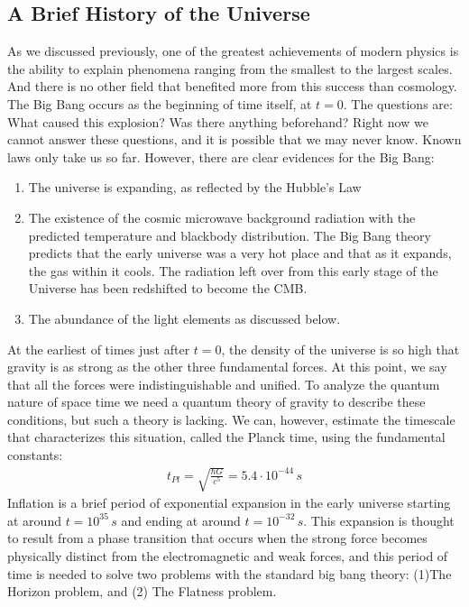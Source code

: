 \documentclass[11pt]{article}
\theoremstyle{break}
\theoremstyle{break}
\begin{document}
\subsection{A Brief History of the Universe}
As we discussed previously, one of the greatest achievements of modern physics is the ability to explain phenomena ranging from the smallest to the largest scales. 
And there is no other field that benefited more from this success than cosmology. \\

The Big Bang occurs as the beginning of time itself, at $t=0$. The questions are: What caused this explosion? Was there anything beforehand? Right now we cannot answer these questions, and it is possible that we may never know. Known laws only take us so far. However, there are clear evidences for the Big Bang:
\begin{enumerate}
\item The universe is expanding, as reflected by the Hubble's Law
\item  The existence of the cosmic microwave background radiation with the predicted temperature and blackbody distribution. The Big Bang theory predicts that the early universe was a very hot place and that as it expands,
the gas within it cools. The radiation left over from this early stage of the Universe has been redshifted to become the CMB.
\item  The abundance of the light elements as discussed below. 
\end{enumerate}

At the earliest of times just after $t=0$, the density of the universe is so high that gravity is as strong as the other three fundamental forces.  At this point, we say that all the forces were indistinguishable and unified. To analyze the quantum nature of space time we need a quantum theory of gravity to describe these conditions, but such a theory is lacking. We can, however, estimate the timescale that characterizes this situation, called the Planck time, using the fundamental constants: 
\begin{align*}
t_{Pl} = \sqrt{\frac{\hbar G}{c^5}} = 5.4\cdot 10^{-44}\, s
\end{align*}
Inflation is a brief period of exponential expansion in the early universe starting at around $t=10^{35}\,s$ and ending at around $t= 10^{-32}\,s$. This expansion is thought to result from a phase transition that occurs when the strong force
becomes physically distinct from the electromagnetic and weak forces, and this period of time is needed to solve two problems with the standard big bang theory: (1)The Horizon problem, and (2) The Flatness problem.\\
\end{document}
